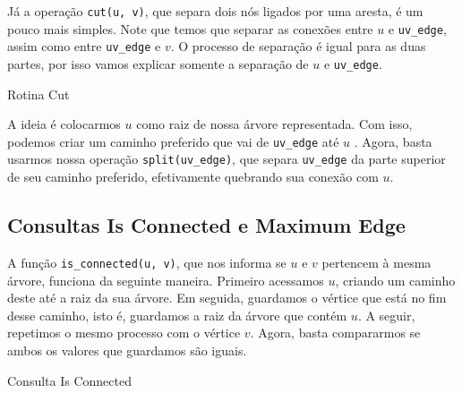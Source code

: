 Já a operação \texttt{cut(u, v)}, que separa dois nós ligados por uma aresta, é um pouco mais simples. Note que temos que separar as conexões entre $u$ e \texttt{uv\_edge}, assim como entre \texttt{uv\_edge} e $v$. O processo de separação é igual para as duas partes, por isso vamos explicar somente a separação de $u$ e \texttt{uv\_edge}.

\begin{algorithm}[h!]
    \caption{Rotina Cut}\label{lct:cut}
    \begin{algorithmic}[1]
        \State {}
        \State {}
        \EndFunction
    \end{algorithmic}
\end{algorithm}

A ideia é colocarmos $u$ como raiz de nossa árvore representada. Com isso, podemos criar um caminho preferido que vai de \texttt{uv\_edge} até $u$ . Agora, basta usarmos nossa operação \texttt{split(uv\_edge)}, que separa \texttt{uv\_edge} da parte superior de seu caminho preferido, efetivamente quebrando sua conexão com $u$.

\subsection{Consultas Is Connected e Maximum Edge}
\label{subsection:lct-is-connected}

A função \texttt{is\_connected(u, v)}, que nos informa se $u$ e $v$ pertencem à mesma árvore, funciona da seguinte maneira. Primeiro acessamos $u$, criando um caminho deste até a raiz da sua árvore. Em seguida, guardamos o vértice que está no fim desse caminho, isto é, guardamos a raiz da árvore que contém $u$. A seguir, repetimos o mesmo processo com o vértice $v$. Agora, basta compararmos se ambos os valores que guardamos são iguais.

\begin{algorithm}[h!]
    \caption{Consulta Is Connected}\label{lct:is-connected}
    \begin{algorithmic}[1]
        \State {}
        \EndFunction
    \end{algorithmic}
\end{algorithm}

